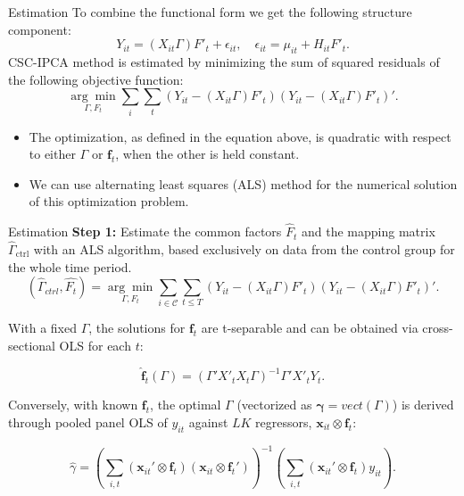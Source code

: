 \documentclass{beamer}
\begin{document}
\begin{frame}{Estimation}
To combine the functional form we get the following structure component:
$$
Y_{it} = (X_{it}\Gamma) F'_{t} + \epsilon_{it}, \quad \epsilon_{it} = \mu_{it} + H_{it} F'_t.
$$
CSC-IPCA method is estimated by minimizing the sum of squared residuals of the following objective function:
$$
\underset{\Gamma, F_t}{\arg\min} \sum_{i} \sum_{t}\left( Y_{it} -(X_{it}\Gamma) F'_{t} \right)\left( Y_{it} - (X_{it}\Gamma) F'_{t}\right)'.
$$
\begin{itemize}
    \item The optimization, as defined in the equation above, is quadratic with respect to either $\Gamma$ or $\boldsymbol{f}_t$, when the other is held constant.
    \item We can use alternating least squares (ALS) method for the numerical solution of this optimization problem.
\end{itemize}
\end{frame}

\begin{frame}{Estimation}
    \textbf{Step 1:} Estimate the common factors $\hat{F}_t$ and the mapping matrix $\hat{\Gamma}_{\text{ctrl}}$ with an ALS algorithm, based exclusively on data from the control group for the whole time period.
    \begin{equation*}
    (\hat{\Gamma}_{ctrl}, \hat{F_t}) = \underset{\Gamma, F_t}{\arg\min} \sum_{i \in \mathcal{C}} \sum_{t \leq T}\left( Y_{it} - (X_{it}\Gamma) F'_{t} \right)\left( Y_{it} - (X_{it}\Gamma) F'_{t} \right)'.
    \end{equation*}
    
    With a fixed $\Gamma$, the solutions for $\boldsymbol{f}_t$ are t-separable and can be obtained via cross-sectional OLS for each $t$:
    
    \begin{equation*}
    \hat{\boldsymbol{f}}_t(\Gamma) = (\Gamma' X'_t X_t \Gamma)^{-1} \Gamma' X'_t Y_t.
    \end{equation*}
    
    Conversely, with known $\boldsymbol{f}_{t}$, the optimal $\Gamma$ (vectorized as $\boldsymbol{\gamma} = vect(\Gamma)$) is derived through pooled panel OLS of $y_{it}$ against $LK$ regressors, $\boldsymbol{x}_{it} \otimes \boldsymbol{f}_t$:
    
    \begin{equation*}
    \hat{\gamma} = \left( \sum_{i,t} (\boldsymbol{x}_{it}' \otimes \boldsymbol{f}_t) (\boldsymbol{x}_{it} \otimes \boldsymbol{f}_t') \right)^{-1} \left( \sum_{i,t} (\boldsymbol{x}_{it}' \otimes \boldsymbol{f}_t) y_{it} \right).
    \end{equation*}
\end{frame}
\end{document}

